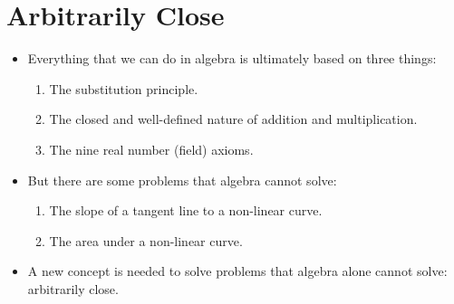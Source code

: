 \documentclass[letterpaper,12pt,fleqn]{article}
\begin{document}
\section*{Arbitrarily Close}

\begin{itemize}[left=0in]
\item Everything that we can do in algebra is ultimately based on three things:
  \begin{enumerate}
  \item The substitution principle.
  \item The closed and well-defined nature of addition and multiplication.
  \item The nine real number (field) axioms.
  \end{enumerate}

\item But there are some problems that algebra cannot solve:
  \begin{enumerate}
  \item The slope of a tangent line to a non-linear curve.
  \item The area under a non-linear curve.
  \end{enumerate}

\item A new concept is needed to solve problems that algebra alone cannot solve: arbitrarily close.
\end{itemize}

\bigskip

\begin{center}
\end{center}

\bigskip

\begin{center}
\end{center}  
\end{document}
